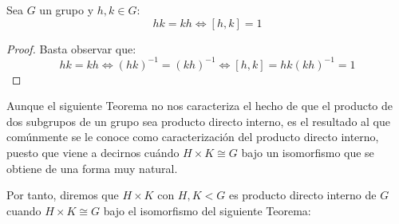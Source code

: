 \begin{prop}\label{prop:primer_conmutador}
    Sea $G$ un grupo y $h,k\in G$:
    \begin{equation*}
        hk = kh \Longleftrightarrow [h,k] = 1
    \end{equation*}
    \begin{proof}
        Basta observar que:
        \begin{equation*}
            hk = kh \Longleftrightarrow {(hk)}^{-1} = {(kh)}^{-1} \Longleftrightarrow [h,k] = hk{(kh)}^{-1} = 1
        \end{equation*}\qedhere
    \end{proof}
\end{prop}

\noindent
Aunque el siguiente Teorema no nos caracteriza el hecho de que el producto de dos subgrupos de un grupo sea producto directo interno, es el resultado al que comúnmente se le conoce como caracterización del producto directo interno, puesto que viene a decirnos cuándo $H\times K \cong G$ bajo un isomorfismo que se obtiene de una forma muy natural.

Por tanto, diremos que $H\times K$ con $H,K<G$ es producto directo interno de $G$ cuando $H\times K\cong G$ bajo el isomorfismo del siguiente Teorema:

